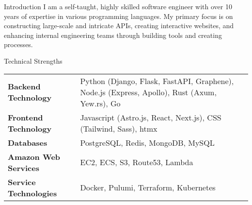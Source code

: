 \documentclass{bluefin_cv}
\begin{document}
\makeheader

\begin{bfcvSection}{Introduction}
I am a self-taught, highly skilled software engineer with over 10 years of expertise in various programming languages.
My primary focus is on constructing large-scale and intricate APIs, creating interactive websites, and enhancing internal engineering teams through building tools and creating processes.
\end{bfcvSection}

\begin{bfcvSection}{Technical Strengths}

\hspace*{-0.25cm}
\begin{tabular}{>{\bfseries}p{}p{}}
Backend Technology & Python (Django, Flask, FastAPI, Graphene), Node.js (Express, Apollo), \newline Rust (Axum, Yew.rs), Go \\
Frontend Technology & Javascript (Astro.js, React, Next.js), CSS (Tailwind, Sass), htmx \\
Databases & PostgreSQL, Redis, MongoDB, MySQL \\
Amazon Web Services & EC2, ECS, S3, Route53, Lambda \\
Service Technologies & Docker, Pulumi, Terraform, Kubernetes \\
\end{tabular}

\end{bfcvSection}
\end{document}
